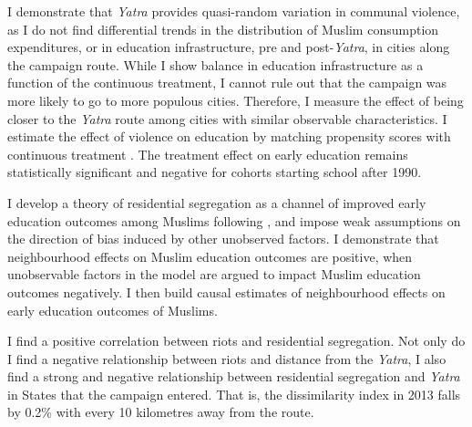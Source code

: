 \documentclass{article}
\begin{document}
I demonstrate that \textit{Yatra} provides quasi-random variation in communal violence, as I do not find differential trends in the distribution of Muslim consumption expenditures, or in education infrastructure, pre and post-\textit{Yatra}, in cities along the campaign route. While I show balance in education infrastructure as a function of the continuous treatment, I cannot rule out that the campaign was more likely to go to more populous cities. Therefore, I measure the effect of being closer to the \textit{Yatra} route among cities with similar observable characteristics. I estimate the effect of violence on education by matching propensity scores with continuous treatment \citep{hirano2004propensity}. The treatment effect on early education remains statistically significant and negative for cohorts starting school after 1990. 

I develop a theory of residential segregation as a channel of improved early education outcomes among Muslims following \cite{abdulkadirouglu2014elite}, and impose weak assumptions on the direction of bias induced by other unobserved factors. I demonstrate that neighbourhood effects on Muslim education outcomes are positive, when unobservable factors in the model are argued to impact Muslim education outcomes negatively. I then build causal estimates of neighbourhood effects on early education outcomes of Muslims. 

I find a positive correlation between riots and residential segregation. Not only do I find a negative relationship between riots and distance from the \emph{Yatra}, I also find a strong and negative relationship between residential segregation and \textit{Yatra} in States that the campaign entered. That is, the dissimilarity index in 2013 falls by 0.2\% with every 10 kilometres away from the route.  
\end{document}
